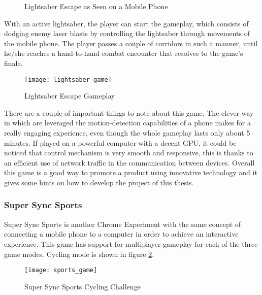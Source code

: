 \begin{figure}[!ht]
    \centering
    \hspace{0.1\textwidth}
    \caption{Lightsaber Escape as Seen on a Mobile Phone}
\end{figure}

With an active lightsaber, the player can start the gameplay, which consists of
dodging enemy laser blasts by controlling the lightsaber through movements of
the mobile phone. The player passes a couple of corridors in such a manner,
until he/she reaches a hand-to-hand combat encounter that resolves to the game's
finale.

\begin{figure}[!h]
\centering
\texttt{[image: lightsaber\_game]}
\caption{Lightsaber Escape Gameplay}\label{fig:lightsaber_game}
\end{figure}

There are a couple of important things to note about this game. The clever way
in which are leveraged the motion-detection capabilities of a phone makes for a
really engaging experience, even though the whole gameplay lasts only about 5
minutes. If played on a powerful computer with a decent GPU, it could be noticed
that control mechanism is very smooth and responsive, this is thanks to an
efficient use of network traffic in the communication between devices. Overall
this game is a good way to promote a product using innovative technology and it
gives some hints on how to develop the project of this thesis.

\subsubsection{Super Sync Sports} %

Super Sync Sports\cite{sports} is another Chrome Experiment with the same
concept of connecting a mobile phone to a computer in order to achieve an
interactive experience. This game has support for multiplayer gameplay for each
of the three game modes. Cycling mode is shown in figure \ref{fig:sports_game}.

\begin{figure}[!h]
\centering
\texttt{[image: sports\_game]}
\caption{Super Sync Sports Cycling Challenge}\label{fig:sports_game}
\end{figure}

